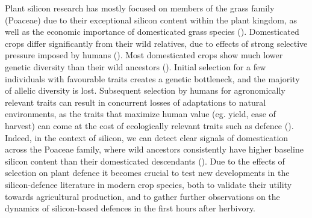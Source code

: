 \documentclass[12pt, letterpaper, ]{report}
\begin{document}
Plant silicon research has mostly focused on members of the grass family (Poaceae) due to their exceptional silicon content within the plant kingdom, as well as the economic importance of domesticated grass species (\cite{reynolds_silicon_2016}). Domesticated crops differ significantly from their wild relatives, due to effects of strong selective pressure imposed by humans (\cite{chen_crop_2015}). Most domesticated crops show much lower genetic diversity than their wild ancestors (\cite{hafeez_creation_2021, smith_domestication_2019}). Initial selection for a few individuals with favourable traits creates a genetic bottleneck, and the majority of allelic diversity is lost. Subsequent selection by humans for agronomically relevant traits can result in concurrent losses of adaptations to natural environments, as the traits that maximize human value (eg. yield, ease of harvest) can come at the cost of ecologically relevant traits such as defence (\cite{whitehead_domestication_2017, chen_crop_2015}). Indeed, in the context of silicon, we can detect clear signals of domestication across the Poaceae family, where wild ancestors consistently have higher baseline silicon content than their domesticated descendants (\cite{simpson_still_2017}). Due to the effects of selection on plant defence it becomes crucial to test new developments in the silicon-defence literature in modern crop species, both to validate their utility towards agricultural production, and to gather further observations on the dynamics of silicon-based defences in the first hours after herbivory.
\end{document}
